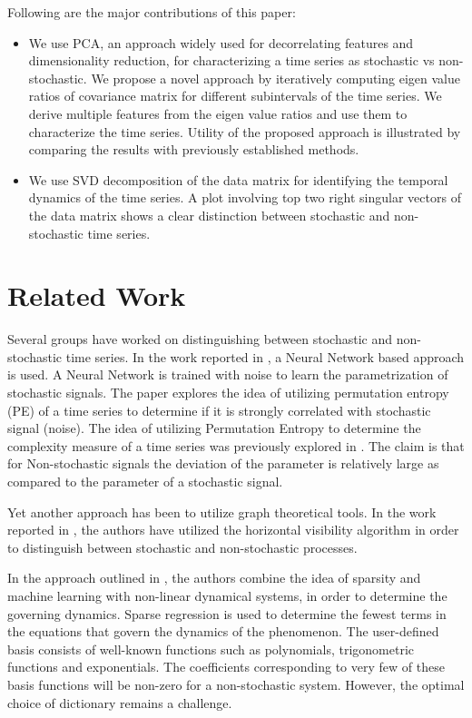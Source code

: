 \documentclass[10pt,conference]{IEEEtran}
\begin{document}
Following are the major contributions of this paper:
\begin{itemize}
  \item We use PCA, an approach widely used for decorrelating features and dimensionality reduction, for characterizing a time series as stochastic vs non-stochastic. We propose a novel approach by iteratively computing eigen value ratios  of covariance matrix for different subintervals of the time series. We  derive multiple features from the eigen value ratios and use them to characterize the time series. Utility of the proposed approach is illustrated by comparing the results with previously established methods.
  \item We use SVD decomposition of the data matrix for identifying the temporal dynamics of the time series. A plot involving top two right singular vectors of the data matrix shows a clear distinction between stochastic and non-stochastic time series.
\end{itemize}
\section{Related Work}
Several groups have worked on distinguishing between stochastic and non-stochastic time series. In the work reported in \cite{Boaretto2021}, a Neural Network based approach is used. A Neural Network is trained with noise to learn the parametrization of stochastic signals. The paper explores the idea of utilizing permutation entropy (PE) of a time series to determine if it is strongly correlated with stochastic signal (noise).  The idea of utilizing Permutation Entropy to determine the complexity measure of a time series was previously explored in \cite{Bandt2002}. The claim is that for Non-stochastic signals the deviation of the parameter is relatively large as compared to the parameter of a stochastic signal.

Yet another approach has been to utilize graph theoretical tools. In the work reported in \cite{lacasa2010}, the authors have utilized
the horizontal visibility algorithm in order to distinguish between stochastic and non-stochastic processes.

In the approach outlined in \cite{Brunton2016}, the authors combine the idea of sparsity and machine learning with non-linear dynamical systems, in order to determine the governing dynamics. Sparse regression is used to determine the fewest terms in the equations that govern the dynamics of the phenomenon. The user-defined basis consists of well-known functions such as polynomials, trigonometric functions and exponentials. The coefficients corresponding to very few of these basis functions will be non-zero for a non-stochastic system. However, the optimal choice of dictionary remains a challenge.
\end{document}
